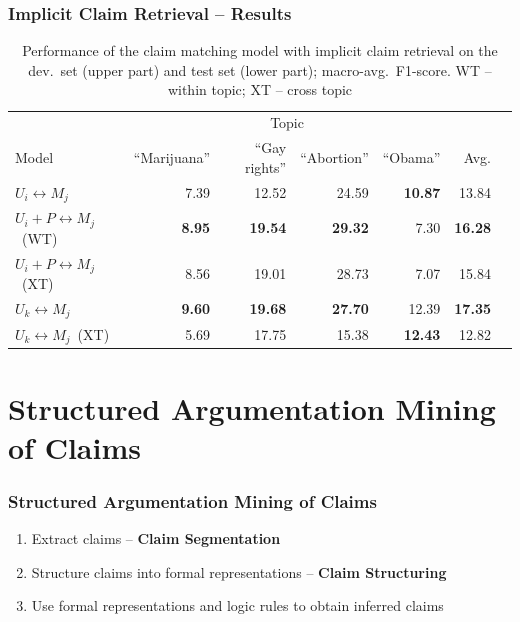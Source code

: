 \documentclass{beamer}
\begin{document}
\begin{frame}

	\frametitle{Implicit Claim Retrieval -- Results}

\begin{table}
\begin{center}
{\scriptsize
\setlength{\tabcolsep}{4.8pt}
\begin{tabular}{lrrrrrr}
\toprule
&\multicolumn{4}{c}{Topic}\\
\cmidrule(lr){2-5}
Model & ``Marijuana'' & ``Gay rights''  & ``Abortion'' & ``Obama'' & Avg. \\
\midrule
$U_i \leftrightarrow M_j$ & 7.39          & 12.52        & 24.59       & {\bf 10.87} & 13.84 \\
$U_i + P \leftrightarrow M_j$\ (WT)     & {\bf 8.95}    & {\bf 19.54}  & {\bf 29.32} & 7.30        & {\bf 16.28} \\
$U_i + P \leftrightarrow M_j$ \ (XT)   & 8.56          & 19.01        & 28.73       & 7.07        & 15.84 \\
\midrule
$U_k \leftrightarrow M_j$            & {\bf 9.60}   & {\bf 19.68}   & {\bf 27.70} & 12.39       & {\bf 17.35} \\
$U_k \leftrightarrow M_j$\ (XT)  & 5.69         &  17.75        & 15.38       & {\bf 12.43} & 12.82 \\
\bottomrule
\end{tabular}}
\caption{Performance of the claim matching model with implicit claim retrieval on the
dev.~set (upper part) and test set (lower part); macro-avg.~F1-score. WT -- within topic; XT -- cross topic}
\label{tab:argpremise_retrieval}
\end{center}
\end{table}
\end{frame}

\section{Structured Argumentation Mining of Claims}

\begin{frame}
	\frametitle{Structured Argumentation Mining of Claims}

	\begin{enumerate}
		\item Extract claims -- \textbf{Claim Segmentation}
			\vspace{1cm}
		\item Structure claims into formal representations -- \textbf{Claim Structuring}
			\vspace{1cm}
		\item Use formal representations and logic rules to obtain inferred claims
	\end{enumerate}

\end{frame}
\end{document}
